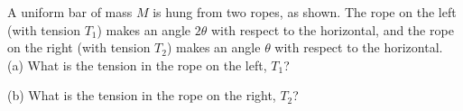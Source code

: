 A uniform bar of mass $M$ is hung from two ropes, as
shown. The rope on the left (with tension $T_1$) makes an angle
$2\theta$ with respect to the horizontal, and the rope on the right
(with tension $T_2$) makes an angle $\theta$ with respect to the
horizontal.\\
%
(a) What is the tension in the rope on the left, $T_1$?\answercheck\hwendpart

(b) What is the tension in the rope on the right, $T_2$?\answercheck

